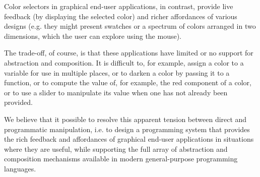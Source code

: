 \documentclass[nonacm]{acmart}
\theoremstyle{slplain}
\numberwithin{thm}{section}
\begin{document}
Color selectors in graphical end-user applications, in contrast, provide live feedback (by displaying the selected color) and richer affordances of various designs (e.g. they might present swatches or a spectrum of colors arranged in  two dimensions, which the user can explore using the mouse). 

The trade-off, of course, is that these applications have limited or no support for abstraction and composition. It is difficult to, for example, assign a
color to a variable for use in multiple places, or to darken a color by passing it to a function, or to compute the value of, for example, the red component of a color, or to use a slider to manipulate its value when one has not already been provided.

We believe that it possible to resolve this apparent tension between direct and programmatic manipulation, i.e. to design a programming system that provides the rich
feedback and affordances of graphical end-user applications in situations where
they are useful, while supporting the full array of abstraction and composition mechanisms
available in modern general-purpose programming languages. 


%
\end{document}
